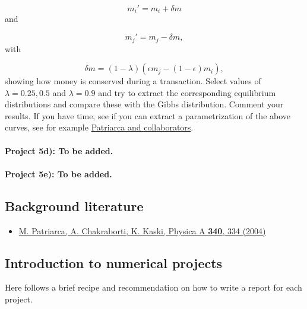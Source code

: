 \documentclass[%
oneside,                 %
final,                   %
10pt]{article}
\begin{document}
\begin{equation*}
  m_i'=m_i+\delta m
  \end{equation*}
  and

\begin{equation*}
  m_j'=m_j-\delta m,
  \end{equation*}
  with

\begin{equation*}
  \delta m=(1-\lambda)(\epsilon m_j-(1-\epsilon)m_i),
  \end{equation*}
  showing how money is conserved during a transaction.
  Select values of $\lambda =0.25,0.5$ and $\lambda=0.9$ and try to extract the corresponding
  equilibrium distributions and compare these with the Gibbs distribution. Comment your results.
  If you have time, see if you can extract a parametrization of the above curves, see for example \href{{http://www.sciencedirect.com/science/article/pii/S0378437104004327}}{Patriarca and collaborators}. 

\paragraph{Project 5d): To be added.}
\paragraph{Project 5e): To be added.}
\subsection{Background literature}

\begin{itemize}
   \item \href{{http://www.sciencedirect.com/science/article/pii/S0378437104004327}}{M. Patriarca, A. Chakraborti, K. Kaski, Physica A \textbf{340}, 334 (2004)}
\end{itemize}

\noindent
\subsection{Introduction to numerical projects}

Here follows a brief recipe and recommendation on how to write a report for each
project.
\end{document}
